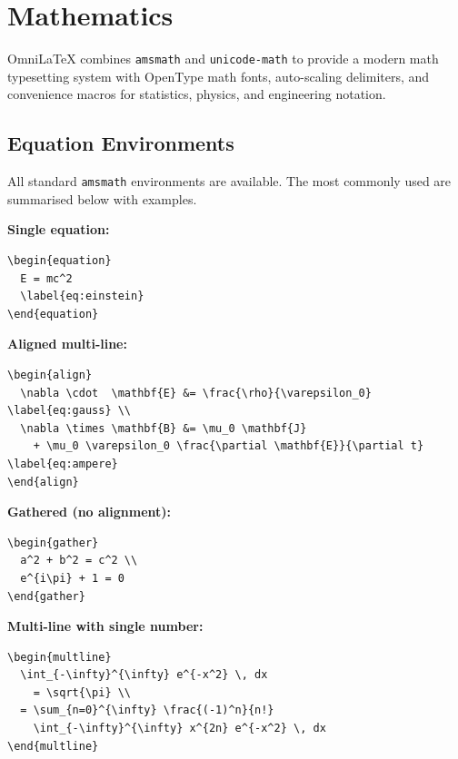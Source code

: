 \chapter{Mathematics}
\label{ch:mathematics}

OmniLaTeX combines \texttt{amsmath} and \texttt{unicode-math} to provide
a modern math typesetting system with OpenType math fonts, auto-scaling
delimiters, and convenience macros for statistics, physics, and
engineering notation.

\section{Equation Environments}

All standard \texttt{amsmath} environments are available.  The most
commonly used are summarised below with examples.

\textbf{Single equation:}

\begin{verbatim}
\begin{equation}
  E = mc^2
  \label{eq:einstein}
\end{equation}
\end{verbatim}

\textbf{Aligned multi-line:}

\begin{verbatim}
\begin{align}
  \nabla \cdot  \mathbf{E} &= \frac{\rho}{\varepsilon_0}  \label{eq:gauss} \\
  \nabla \times \mathbf{B} &= \mu_0 \mathbf{J}
    + \mu_0 \varepsilon_0 \frac{\partial \mathbf{E}}{\partial t} \label{eq:ampere}
\end{align}
\end{verbatim}

\textbf{Gathered (no alignment):}

\begin{verbatim}
\begin{gather}
  a^2 + b^2 = c^2 \\
  e^{i\pi} + 1 = 0
\end{gather}
\end{verbatim}

\textbf{Multi-line with single number:}

\begin{verbatim}
\begin{multline}
  \int_{-\infty}^{\infty} e^{-x^2} \, dx
    = \sqrt{\pi} \\
  = \sum_{n=0}^{\infty} \frac{(-1)^n}{n!}
    \int_{-\infty}^{\infty} x^{2n} e^{-x^2} \, dx
\end{multline}
\end{verbatim}

